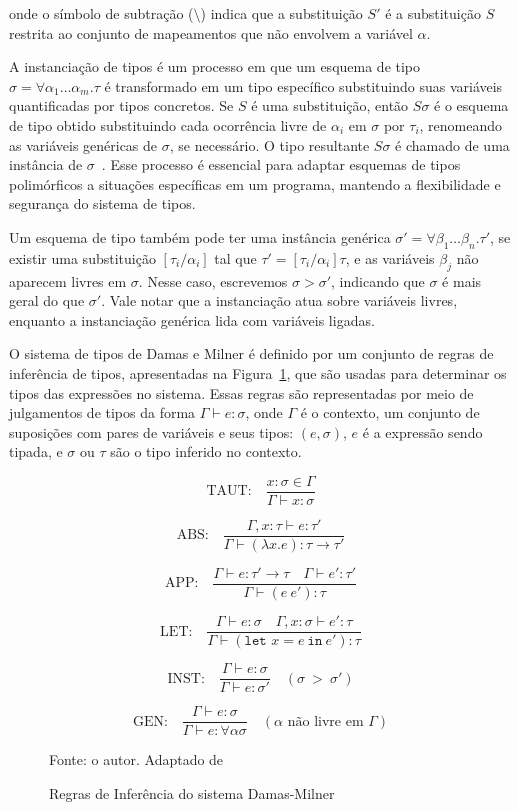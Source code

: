onde o símbolo de subtração ($\setminus$) indica que a substituição $S'$ é a substituição $S$ restrita ao conjunto de mapeamentos que não envolvem a variável $\alpha$.

A instanciação de tipos é um processo em que um esquema de tipo $\sigma = \forall \alpha_1 \ldots \alpha_m. \tau$ é transformado em um tipo específico substituindo suas variáveis quantificadas por tipos concretos.
Se $S$ é uma substituição, então $S\sigma$ é o esquema de tipo obtido substituindo cada ocorrência livre de $\alpha_i$ em $\sigma$ por $\tau_i$, renomeando as variáveis genéricas de $\sigma$, se necessário.
O tipo resultante $S\sigma$ é chamado de uma instância de $\sigma$~\cite{DAMAS1982}.
Esse processo é essencial para adaptar esquemas de tipos polimórficos a situações específicas em um programa, mantendo a flexibilidade e segurança do sistema de tipos.

Um esquema de tipo também pode ter uma instância genérica $\sigma' = \forall \beta_1 \ldots \beta_n. \tau'$, se existir uma substituição $[ \tau_i / \alpha_i ]$ tal que $\tau' = [\tau_i / \alpha_i]\tau$, e as variáveis $\beta_j$ não aparecem livres em $\sigma$.
Nesse caso, escrevemos $\sigma > \sigma'$, indicando que $\sigma$ é mais geral do que $\sigma'$.
Vale notar que a instanciação atua sobre variáveis livres, enquanto a instanciação genérica lida com variáveis ligadas.

O sistema de tipos de Damas e Milner é definido por um conjunto de regras de inferência de tipos, apresentadas na Figura~\ref{eq:type-inference}, que são usadas para determinar os tipos das expressões no sistema.
Essas regras são representadas por meio de julgamentos de tipos da forma $\Gamma \vdash e: \sigma$, onde $\Gamma$ é o contexto, um conjunto de suposições com pares de variáveis e seus tipos: $(e, \sigma)$, $e$ é a expressão sendo tipada, e $\sigma$ ou $\tau$ são o tipo inferido no contexto.

\begin{figure}[ht!]
  \caption{Regras de Inferência do sistema Damas-Milner}
  \centering
  \[
    \text{TAUT:} \quad \frac{x : \sigma \in \Gamma}{\Gamma \vdash x : \sigma}
  \]

  \[
    \text{ABS:} \quad \frac{\Gamma, x : \tau \vdash e : \tau'}{\Gamma \vdash (\lambda x. e) : \tau \to \tau'}
  \]

  \[
    \text{APP:} \quad \frac{\Gamma \vdash e : \tau' \to \tau \quad \Gamma \vdash e' : \tau'}{\Gamma \vdash (e \ e') : \tau}
  \]

  \[
    \text{LET:} \quad \frac{\Gamma \vdash e : \sigma \quad \Gamma, x : \sigma \vdash e' : \tau}{\Gamma \vdash (\texttt{let } x = e \ \texttt{in} \ e') : \tau}
  \]

  \[
    \text{INST:} \quad \frac{\Gamma \vdash e : \sigma}{\Gamma \vdash e : \sigma'} \quad \scriptstyle (\sigma\ >\ \sigma')
  \]

  \[
    \text{GEN:} \quad \frac{\Gamma \vdash e : \sigma}{\Gamma \vdash e : \forall \alpha \sigma} \quad \scriptstyle (\alpha \text{ não livre em } \Gamma)
  \]

  \small{Fonte: o autor. Adaptado de~\cite{DAMAS1982}}\label{eq:type-inference}
\end{figure}


